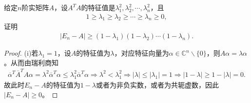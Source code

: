 \documentclass[../../main.tex]{subfiles}
\begin{document}
\begin{example}
给定$n$阶实矩阵$A$，设$A^T A$的特征值是$\lambda_1^2,\lambda_2^2,\cdots,\lambda_n^2$，且
\begin{align*}
1 \geqslant \lambda_1 \geqslant \lambda_2 \geqslant \cdots \geqslant \lambda_n \geqslant 0,
\end{align*}
证明
\begin{align*}
|E_n - A| \geqslant (1 - \lambda_1)(1 - \lambda_2)\cdots(1 - \lambda_n).
\end{align*}
\end{example}
\begin{proof}
(i)若$\lambda_1=1$，设$A$的特征值为$\lambda$，对应特征向量为$\alpha \in \mathbb{C}^n\backslash \{0\}$，则$A\alpha=\lambda \alpha$。从而由瑞利商知
\begin{align*}
\overline{\alpha}^T\overline{A}^TA\alpha=\lambda^2\overline{\alpha}^T\alpha \leqslant \lambda_1^2\overline{\alpha}^T\alpha \Longrightarrow \lambda^2<\lambda_1^2
\Longrightarrow |\lambda| \leqslant |\lambda_1|=1 \Longrightarrow |1-\lambda| \geqslant 1-|\lambda|=0.
\end{align*}
故此时$E_n-A$的特征值为$1-\lambda$或者为非负实数，或者为共轭虚数，因此$|E_n-A| \geqslant 0$。


\end{proof}
\end{document}
